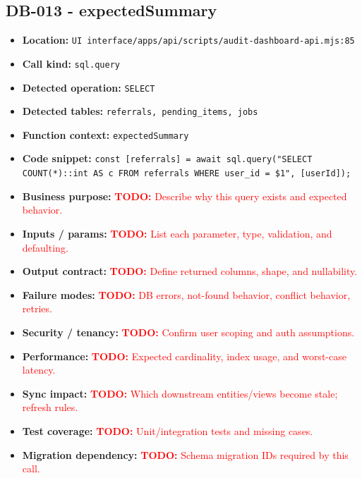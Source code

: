 \documentclass[11pt]{article}
\newcommand{\todoitem}[1]{\textcolor{red}{\textbf{TODO:} #1}}
\begin{document}
\subsection{DB-013 - expectedSummary}
\begin{itemize}[leftmargin=1.5em]
\item \textbf{Location:} \texttt{UI interface/apps/api/scripts/audit-dashboard-api.mjs:85}
\item \textbf{Call kind:} \texttt{sql.query}
\item \textbf{Detected operation:} \texttt{SELECT}
\item \textbf{Detected tables:} \texttt{referrals, pending\_items, jobs}
\item \textbf{Function context:} \texttt{expectedSummary}
\item \textbf{Code snippet:} \texttt{const [referrals] = await sql.query("SELECT COUNT(*)::int AS c FROM referrals WHERE user\_id = \$1", [userId]);}
\item \textbf{Business purpose:} \todoitem{Describe why this query exists and expected behavior.}
\item \textbf{Inputs / params:} \todoitem{List each parameter, type, validation, and defaulting.}
\item \textbf{Output contract:} \todoitem{Define returned columns, shape, and nullability.}
\item \textbf{Failure modes:} \todoitem{DB errors, not-found behavior, conflict behavior, retries.}
\item \textbf{Security / tenancy:} \todoitem{Confirm user scoping and auth assumptions.}
\item \textbf{Performance:} \todoitem{Expected cardinality, index usage, and worst-case latency.}
\item \textbf{Sync impact:} \todoitem{Which downstream entities/views become stale; refresh rules.}
\item \textbf{Test coverage:} \todoitem{Unit/integration tests and missing cases.}
\item \textbf{Migration dependency:} \todoitem{Schema migration IDs required by this call.}
\end{itemize}
\end{document}

